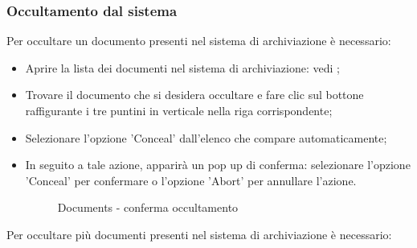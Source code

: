 \documentclass[10pt, a4paper]{article}
\begin{document}
\subsubsection{Occultamento dal sistema}
\label{sec:concealDocs}
Per occultare un documento presenti nel sistema di archiviazione è necessario:
\begin{itemize}
    \item Aprire la lista dei documenti nel sistema di archiviazione: vedi ;
    \item Trovare il documento che si desidera occultare e fare clic sul bottone raffigurante i tre puntini in verticale nella riga corrispondente;
    \item Selezionare l'opzione 'Conceal' dall'elenco che compare automaticamente;
    \item In seguito a tale azione, apparirà un pop up di conferma: selezionare l'opzione 'Conceal' per confermare o l'opzione 'Abort' per annullare l'azione.
    
    \begin{figure}[H]
        \centering  
        \caption{Documents - conferma occultamento}
        \label{img:confirmConceal}
    \end{figure}
\end{itemize}
Per occultare più documenti presenti nel sistema di archiviazione è necessario:
\end{document}

